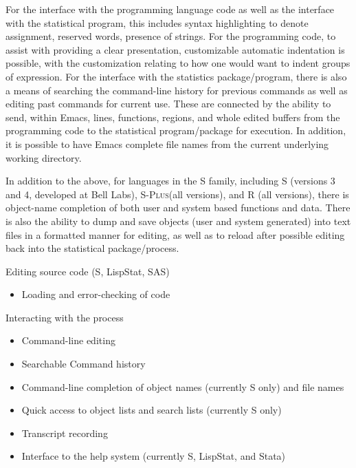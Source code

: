 \documentclass{article}
\newcommand*{\Splus}{\textsc{S-Plus}}
\begin{document}
For the interface with the programming language code as well as the
interface with the statistical program, this includes syntax
highlighting to denote assignment, reserved words, presence of
strings.  For the programming code, to assist with providing a clear
presentation, customizable automatic indentation is possible, with the
customization relating to how one would want to indent groups of
expression.  For the interface with the statistics package/program,
there is also a means of searching the command-line history for
previous commands as well as editing past commands for current use.
These are connected by the ability to send, within Emacs, lines,
functions, regions, and whole edited buffers from the programming code
to the statistical program/package for execution.  In addition, it is
possible to have Emacs complete file names from the current underlying
working directory.

In addition to the above, for languages in the S family, including S
(versions 3 and 4, developed at Bell Labs), \Splus (all versions), and
R (all versions), there is object-name completion of both user and
system based functions and data.  There is also the ability to dump
and save objects (user and system generated) into text files in a
formatted manner for editing, as well as to reload after possible
editing back into the statistical package/process.

Editing source code (S, LispStat, SAS)
\begin{itemize}
\item Loading and error-checking of code
\end{itemize}

Interacting with the process
\begin{itemize}
\item Command-line editing
\item Searchable Command history
\item Command-line completion of object names (currently S only) and file names
\item Quick access to object lists and search lists (currently S only)
\item Transcript recording
\item Interface to the help system (currently S, LispStat, and Stata)
\end{itemize}
\end{document}
